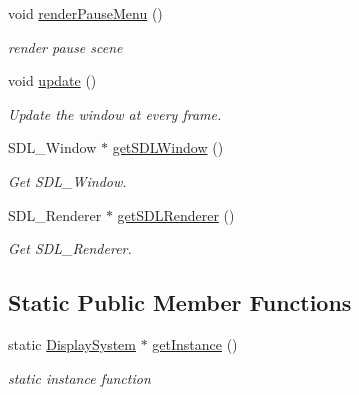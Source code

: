 \begin{DoxyCompactItemize}
void \mbox{\hyperlink{class_display_system_aad59400c0b45f9b32f61ab40b181c27c}{render\+Pause\+Menu}} ()
\begin{DoxyCompactList}\small\item\em render pause scene \end{DoxyCompactList}\item 
\mbox{\label{class_display_system_a8563ab2f834986a55cf40e6739352593}} 
void \mbox{\hyperlink{class_display_system_a8563ab2f834986a55cf40e6739352593}{update}} ()
\begin{DoxyCompactList}\small\item\em Update the window at every frame. \end{DoxyCompactList}\item 
\mbox{\label{class_display_system_a510da31a4e185ede7d1a802e5894e722}} 
S\+D\+L\+\_\+\+Window $\ast$ \mbox{\hyperlink{class_display_system_a510da31a4e185ede7d1a802e5894e722}{get\+S\+D\+L\+Window}} ()
\begin{DoxyCompactList}\small\item\em Get S\+D\+L\+\_\+\+Window. \end{DoxyCompactList}\item 
\mbox{\label{class_display_system_ab4fd80008bbb6141e43bae5e2fcc9d4a}} 
S\+D\+L\+\_\+\+Renderer $\ast$ \mbox{\hyperlink{class_display_system_ab4fd80008bbb6141e43bae5e2fcc9d4a}{get\+S\+D\+L\+Renderer}} ()
\begin{DoxyCompactList}\small\item\em Get S\+D\+L\+\_\+\+Renderer. \end{DoxyCompactList}\end{DoxyCompactItemize}
\subsection*{Static Public Member Functions}
\begin{DoxyCompactItemize}
\item 
static \mbox{\hyperlink{class_display_system}{Display\+System}} $\ast$ \mbox{\hyperlink{class_display_system_a0c534969353819f8f0e2fafe212734bc}{get\+Instance}} ()
\begin{DoxyCompactList}\small\item\em static instance function \end{DoxyCompactList}\end{DoxyCompactItemize}
